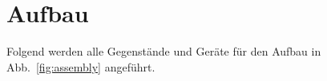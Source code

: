 %

\section{Aufbau}
\label{sec:assembly}

Folgend werden alle Gegenstände und Geräte für den Aufbau in Abb.~\ref{fig:assembly} angeführt.

